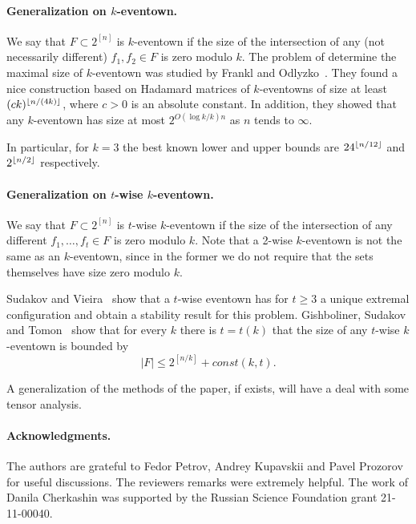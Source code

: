 \documentclass[8pt]{article}
\begin{document}
\paragraph{Generalization on $k$-eventown.}
We say that $F \subset 2^{[n]}$ is $k$-eventown if the size of the intersection of any (not necessarily different) $f_1, f_2 \in F$ is zero modulo $k$.
The problem of determine the maximal size of $k$-eventown was studied by Frankl and Odlyzko~\cite{frankl1983subsets}.
They found a nice construction based on Hadamard matrices of $k$-eventowns of size at least $(ck)^{\left\lfloor n/(4k) \right\rfloor}$, where $c > 0$ is an absolute constant. 
In addition, they showed that any $k$-eventown has size at most $2^{O(\log k/k)n}$ as $n$ tends to $\infty$. 

In particular, for $k = 3$ the best known lower and upper bounds are $24^{\left\lfloor n/12 \right\rfloor}$ and $2^{\left\lfloor n/2 \right\rfloor}$ respectively.



\paragraph{Generalization on $t$-wise $k$-eventown.}
We say that $F \subset 2^{[n]}$ is $t$-wise $k$-eventown if the size of the intersection of any different $f_1,\dots, f_t \in F$ is zero modulo $k$.
Note that a 2-wise $k$-eventown is not the same as an $k$-eventown, since in the former we do not require that the sets themselves
have size zero modulo $k$. 

Sudakov and Vieira~\cite{sudakov2018two} show that a $t$-wise eventown has for $t \geq 3$ a unique extremal configuration and obtain a stability result for this problem. Gishboliner, Sudakov and Tomon~\cite{gishboliner2021small} show that for every $k$ there is $t = t(k)$ that
the size of any $t$-wise $k$-eventown is bounded by
\[
|F| \leq 2^{[n/k]} + const(k,t).
\]

A generalization of the methods of the paper, if exists, will have a deal with some tensor analysis.






\paragraph{Acknowledgments.} The authors are grateful to Fedor Petrov, Andrey Kupavskii and Pavel Prozorov for useful discussions. 
The reviewers remarks were extremely helpful. The work of Danila Cherkashin was supported by the Russian Science Foundation grant 21-11-00040.




\end{document}
